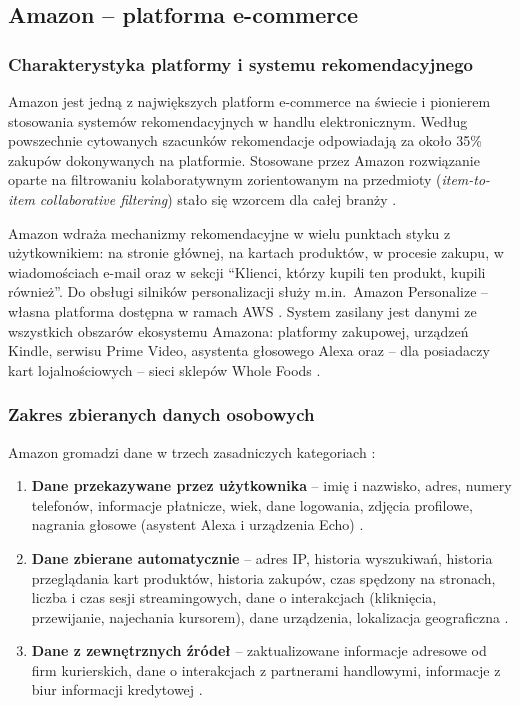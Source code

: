 \documentclass[12pt, a4paper]{article}
\begin{document}
\subsection{Amazon -- platforma e-commerce}

\subsubsection{Charakterystyka platformy i systemu rekomendacyjnego}

Amazon jest jedną z największych platform e-commerce na świecie i pionierem stosowania systemów rekomendacyjnych w handlu elektronicznym. Według powszechnie cytowanych szacunków rekomendacje odpowiadają za około 35\% zakupów dokonywanych na platformie. Stosowane przez Amazon rozwiązanie oparte na filtrowaniu kolaboratywnym zorientowanym na przedmioty (\textit{item-to-item collaborative filtering}) stało się wzorcem dla całej branży \cite{himeur2022}.

Amazon wdraża mechanizmy rekomendacyjne w wielu punktach styku z użytkownikiem: na stronie głównej, na kartach produktów, w procesie zakupu, w wiadomościach e-mail oraz w sekcji ``Klienci, którzy kupili ten produkt, kupili również''. Do obsługi silników personalizacji służy m.in.\ Amazon Personalize -- własna platforma dostępna w ramach AWS \cite{amazon_dsp}. System zasilany jest danymi ze wszystkich obszarów ekosystemu Amazona: platformy zakupowej, urządzeń Kindle, serwisu Prime Video, asystenta głosowego Alexa oraz -- dla posiadaczy kart lojalnościowych -- sieci sklepów Whole Foods \cite{amazon_privacy}.

\subsubsection{Zakres zbieranych danych osobowych}

Amazon gromadzi dane w trzech zasadniczych kategoriach \cite{amazon_privacy}:

\begin{enumerate}
  \item \textbf{Dane przekazywane przez użytkownika} -- imię i nazwisko, adres, numery telefonów, informacje płatnicze, wiek, dane logowania, zdjęcia profilowe, nagrania głosowe (asystent Alexa i urządzenia Echo) \cite{amazon_privacy}.
  \item \textbf{Dane zbierane automatycznie} -- adres IP, historia wyszukiwań, historia przeglądania kart produktów, historia zakupów, czas spędzony na stronach, liczba i czas sesji streamingowych, dane o interakcjach (kliknięcia, przewijanie, najechania kursorem), dane urządzenia, lokalizacja geograficzna \cite{amazon_privacy}.
  \item \textbf{Dane z zewnętrznych źródeł} -- zaktualizowane informacje adresowe od firm kurierskich, dane o interakcjach z partnerami handlowymi, informacje z biur informacji kredytowej \cite{amazon_privacy}.
\end{enumerate}
\end{document}
